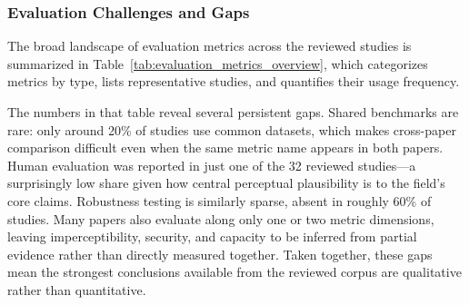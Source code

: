 \subsubsection{Evaluation Challenges and Gaps}

The broad landscape of evaluation metrics across the reviewed studies is summarized in Table~\ref{tab:evaluation_metrics_overview}, which categorizes metrics by type, lists representative studies, and quantifies their usage frequency.

The numbers in that table reveal several persistent gaps. Shared benchmarks are rare: only around 20\% of studies use common datasets, which makes cross-paper comparison difficult even when the same metric name appears in both papers. Human evaluation was reported in just one of the 32 reviewed studies---a surprisingly low share given how central perceptual plausibility is to the field's core claims. Robustness testing is similarly sparse, absent in roughly 60\% of studies. Many papers also evaluate along only one or two metric dimensions, leaving imperceptibility, security, and capacity to be inferred from partial evidence rather than directly measured together. Taken together, these gaps mean the strongest conclusions available from the reviewed corpus are qualitative rather than quantitative.


